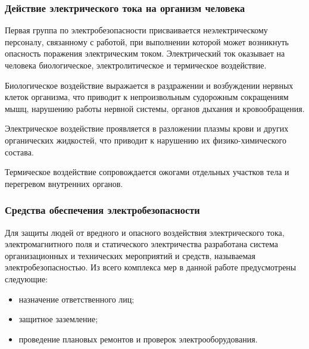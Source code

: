 \subsubsection{Действие электрического тока на организм человека}
Первая группа по электробезопасности  присваивается неэлектрическому персоналу, связанному с работой,
при выполнении которой может  возникнуть опасность поражения электрическим током.
Электрический ток оказывает на человека биологическое, электролитическое и термическое воздействие.


Биологическое воздействие выражается в раздражении и возбуждении нервных
клеток организма, что приводит к непроизвольным судорожным сокращениям мышц, нарушению
работы нервной системы, органов дыхания и кровообращения.


Электрическое воздействие проявляется в разложении плазмы крови и других
органических жидкостей, что приводит к нарушению их физико-химического
состава.


Термическое воздействие сопровождается ожогами отдельных участков
тела и перегревом внутренних органов.



\subsubsection{Средства обеспечения электробезопасности}
Для защиты людей от вредного и опасного воздействия электрического тока,
электромагнитного поля и статического электричества разработана система 
организационных и технических мероприятий и средств, называемая
электробезопасностью. Из всего комплекса мер в данной работе предусмотрены
следующие:
\begin{itemize}
	\item{} назначение ответственного лиц;
	\item{} защитное заземление;
	\item{} проведение плановых ремонтов и проверок электрооборудования.
\end{itemize}


